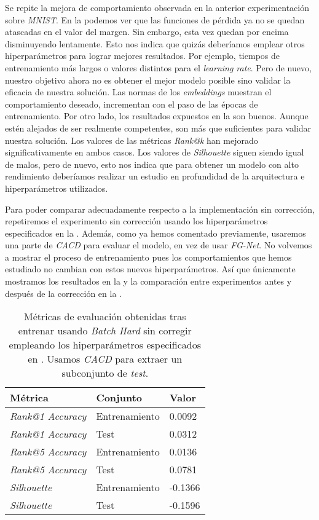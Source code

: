 Se repite la mejora de comportamiento observada en la anterior experimentación sobre \textit{MNIST}. En la  podemos ver que las funciones de pérdida ya no se quedan atascadas en el valor del margen. Sin embargo, esta vez quedan por encima disminuyendo lentamente. Esto nos indica que quizás deberíamos emplear otros hiperparámetros para lograr mejores resultados. Por ejemplo, tiempos de entrenamiento más largos o valores distintos para el \textit{learning rate}. Pero de nuevo, nuestro objetivo ahora no es obtener el mejor modelo posible sino validar la eficacia de nuestra solución. Las normas de los \textit{embeddings} muestran el comportamiento deseado, incrementan con el paso de las épocas de entrenamiento. Por otro lado, los resultados expuestos en la  son buenos. Aunque estén alejados de ser realmente competentes, son más que suficientes para validar nuestra solución. Los valores de las métricas \textit{Rank@k} han mejorado significativamente en ambos casos. Los valores de \textit{Silhouette} siguen siendo igual de malos, pero de nuevo, esto nos indica que para obtener un modelo con alto rendimiento deberíamos realizar un estudio en profundidad de la arquitectura e hiperparámetros utilizados.

Para poder comparar adecuadamente respecto a la implementación sin corrección, repetiremos el experimento sin corrección usando los hiperparámetros especificados en la . Además, como ya hemos comentado previamente, usaremos una parte de \textit{CACD} para evaluar el modelo, en vez de usar \textit{FG-Net}. No volvemos a mostrar el proceso de entrenamiento pues los comportamientos que hemos estudiado no cambian con estos nuevos hiperparámetros. Así que únicamente mostramos los resultados en la  y la comparación entre experimentos antes y después de la corrección en la .


\begin{table}[!hbtp]
\centering
\begin{tabular}{|l|l|l|}
    \hline
    Métrica & Conjunto & Valor \\
    \hline
    \textit{Rank@1 Accuracy} & Entrenamiento & 0.0092  \\
    \textit{Rank@1 Accuracy} & Test & 0.0312  \\
    \textit{Rank@5 Accuracy} & Entrenamiento & 0.0136   \\
    \textit{Rank@5 Accuracy} & Test & 0.0781  \\
    \textit{Silhouette} & Entrenamiento & -0.1366 \\
    \textit{Silhouette} & Test & -0.1596 \\
    \hline
\end{tabular}
    \caption{Métricas de evaluación obtenidas tras entrenar usando \textit{Batch Hard} sin corregir empleando los hiperparámetros especificados en . Usamos \textit{CACD} para extraer un subconjunto de \textit{test}.}
\label{table:resultados_cacd_mal_nueva}
\end{table}

